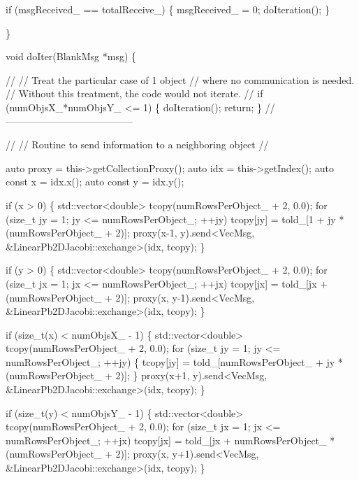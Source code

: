 \begin{DoxyCodeInclude}
    \textcolor{keywordflow}{if} (msgReceived\_ == totalReceive\_) \{
      msgReceived\_ = 0;
      doIteration();
    \}

  \}

  \textcolor{keywordtype}{void} doIter(BlankMsg *msg) \{

    \textcolor{comment}{//}
    \textcolor{comment}{// Treat the particular case of 1 object}
    \textcolor{comment}{// where no communication is needed.}
    \textcolor{comment}{// Without this treatment, the code would not iterate.}
    \textcolor{comment}{//}
    \textcolor{keywordflow}{if} (numObjsX\_*numObjsY\_ <= 1) \{
      doIteration();
      \textcolor{keywordflow}{return};
    \}
    \textcolor{comment}{//---------------------------------------}

    \textcolor{comment}{//}
    \textcolor{comment}{// Routine to send information to a neighboring object}
    \textcolor{comment}{//}

    \textcolor{keyword}{auto} proxy = this->getCollectionProxy();
    \textcolor{keyword}{auto} idx = this->getIndex();
    \textcolor{keyword}{auto} \textcolor{keyword}{const} x = idx.x();
    \textcolor{keyword}{auto} \textcolor{keyword}{const} y = idx.y();

    \textcolor{keywordflow}{if} (x > 0) \{
      std::vector<double> tcopy(numRowsPerObject\_ + 2, 0.0);
      \textcolor{keywordflow}{for} (\textcolor{keywordtype}{size\_t} jy = 1; jy <= numRowsPerObject\_; ++jy)
        tcopy[jy] = told\_[1 + jy * (numRowsPerObject\_ + 2)];
      proxy(x-1, y).send<VecMsg, &LinearPb2DJacobi::exchange>(idx, tcopy);
    \}

    \textcolor{keywordflow}{if} (y > 0) \{
      std::vector<double> tcopy(numRowsPerObject\_ + 2, 0.0);
      \textcolor{keywordflow}{for} (\textcolor{keywordtype}{size\_t} jx = 1; jx <= numRowsPerObject\_; ++jx)
        tcopy[jx] = told\_[jx + (numRowsPerObject\_ + 2)];
      proxy(x, y-1).send<VecMsg, &LinearPb2DJacobi::exchange>(idx, tcopy);
    \}

    \textcolor{keywordflow}{if} (\textcolor{keywordtype}{size\_t}(x) < numObjsX\_ - 1) \{
      std::vector<double> tcopy(numRowsPerObject\_ + 2, 0.0);
      \textcolor{keywordflow}{for} (\textcolor{keywordtype}{size\_t} jy = 1; jy <= numRowsPerObject\_; ++jy) \{
        tcopy[jy] = told\_[numRowsPerObject\_ +
                          jy * (numRowsPerObject\_ + 2)];
      \}
      proxy(x+1, y).send<VecMsg, &LinearPb2DJacobi::exchange>(idx, tcopy);
    \}

    \textcolor{keywordflow}{if} (\textcolor{keywordtype}{size\_t}(y) < numObjsY\_ - 1) \{
      std::vector<double> tcopy(numRowsPerObject\_ + 2, 0.0);
      \textcolor{keywordflow}{for} (\textcolor{keywordtype}{size\_t} jx = 1; jx <= numRowsPerObject\_; ++jx)
        tcopy[jx] = told\_[jx + numRowsPerObject\_ * (numRowsPerObject\_ + 2)];
      proxy(x, y+1).send<VecMsg, &LinearPb2DJacobi::exchange>(idx, tcopy);
    \}


\end{DoxyCodeInclude}
